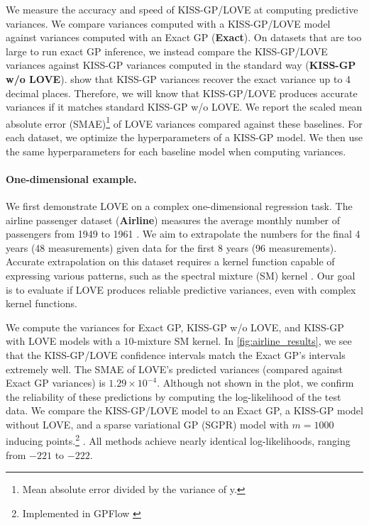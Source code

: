 We measure the accuracy and speed of KISS-GP/LOVE{} at computing predictive variances.
We compare variances computed with a KISS-GP/LOVE{} model against variances computed with an Exact GP ({\bf Exact}).
On datasets that are too large to run exact GP inference, we instead compare the KISS-GP/LOVE{} variances against KISS-GP variances computed in the standard way ({\bf KISS-GP w/o LOVE{}}).
\citet{wilson2015thoughts} show that KISS-GP variances recover the exact variance up to 4 decimal places.
Therefore, we will know that KISS-GP/LOVE{} produces accurate variances if it matches standard KISS-GP w/o LOVE{}.
We report the scaled mean absolute error (SMAE)\footnote{
  Mean absolute error divided by the variance of y.
} \cite{rasmussen2006gaussian} of LOVE{} variances compared against these baselines.
For each dataset, we optimize the hyperparameters of a KISS-GP model.
We then use the same hyperparameters for each baseline model when computing variances.

\paragraph{One-dimensional example.}
We first demonstrate LOVE{} on a complex one-dimensional regression task.
The airline passenger dataset ({\bf Airline}) measures the average monthly number of passengers from 1949 to 1961 \cite{hyndman2005time}.
We aim to extrapolate the numbers for the final 4 years (48 measurements) given data for the first 8 years (96 measurements).
Accurate extrapolation on this dataset requires a kernel function capable of expressing various patterns, such as the spectral mixture (SM) kernel \cite{wilson2013gaussian}.
Our goal is to evaluate if LOVE{} produces reliable predictive variances, even with complex kernel functions.

We compute the variances for Exact GP, KISS-GP w/o LOVE{}, and KISS-GP with LOVE{} models with a $10$-mixture SM kernel.
In \autoref{fig:airline_results}, we see that the KISS-GP/LOVE{} confidence intervals match the Exact GP's intervals extremely well.
The SMAE of LOVE{}'s predicted variances (compared against Exact GP variances) is $1.29 \times 10^{-4}$.
Although not shown in the plot, we confirm the reliability of these predictions by computing the log-likelihood of the test data.
We compare the KISS-GP/LOVE{} model to an Exact GP, a KISS-GP model without LOVE{}, and a sparse variational GP (SGPR) model with $m=1000$ inducing points.\footnote{
 Implemented in GPFlow \cite{matthews2017gpflow}} \cite{titsias2009variational,hensman2013gaussian}.
All methods achieve nearly identical log-likelihoods, ranging from $-221$ to $-222$.

